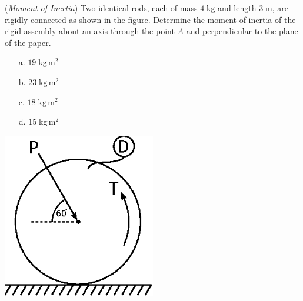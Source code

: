 \documentclass[addpoints, 12pt]{exam}
\begin{document}
\begin{questions}
\begin{minipage}{0.5\textwidth}
\question(\textit{Moment of Inertia})
Two identical rods, each of mass $4 \; \unit{\kilo\gram}$ and length $3 \;
\unit{\meter}$, are rigidly connected as shown in the figure. Determine the
moment of inertia of the rigid assembly about an axis through the point $A$ and 
perpendicular to the plane of the paper. \\[0.5ex]

\begin{minipage}{0.45\textwidth}
    \begin{center}
    \begin{itemize}
        \setlength\itemsep{-0.4em}
        \item[a.] $19 \; \unit{\kilo\gram\,\meter^2}$
        \item[b.] $23 \; \unit{\kilo\gram\,\meter^2}$
    \end{itemize}
    \end{center}
\end{minipage}
\begin{minipage}{0.45\textwidth}
    \begin{center}
    \begin{itemize}
        \setlength\itemsep{-0.4em}
        \item[c.] $18 \; \unit{\kilo\gram\,\meter^2}$
        \item[d.] $15 \; \unit{\kilo\gram\,\meter^2}$
    \end{itemize}
    \end{center}
\end{minipage}

\end{minipage}
%
\begin{minipage}{0.5\textwidth}
    \centering
    \includegraphics[width=0.5\textwidth,valign=c]{./figures/question6.eps}
\end{minipage}



\end{questions}
\end{document}
